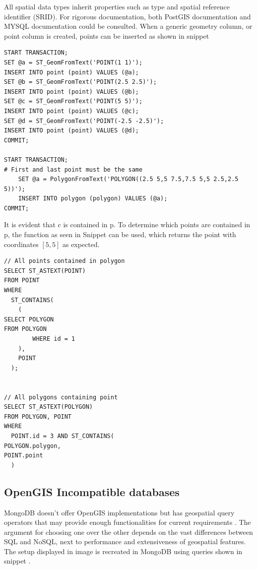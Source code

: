 All spatial data types inherit properties such as type and spatial reference identifier (SRID). For rigorous documentation, both PostGIS documentation  and MYSQL documentation  could be consulted. When a generic geometry column, or point column is created, points can be inserted as shown in snippet 

\begin{Verbatim}[fontsize=\scriptsize]
START TRANSACTION;
SET @a = ST_GeomFromText('POINT(1 1)');
INSERT INTO point (point) VALUES (@a);
SET @b = ST_GeomFromText('POINT(2.5 2.5)');
INSERT INTO point (point) VALUES (@b);
SET @c = ST_GeomFromText('POINT(5 5)');
INSERT INTO point (point) VALUES (@c);
SET @d = ST_GeomFromText('POINT(-2.5 -2.5)');
INSERT INTO point (point) VALUES (@d);
COMMIT;

START TRANSACTION;
# First and last point must be the same
	SET @a = PolygonFromText('POLYGON((2.5 5,5 7.5,7.5 5,5 2.5,2.5 5))');
	INSERT INTO polygon (polygon) VALUES (@a);
COMMIT;
\end{Verbatim}

It is evident that c is contained in p. To determine which points are contained in p, the function as seen in Snippet  can be used, which returns the point with coordinates $[5, 5]$ as expected.

\begin{Verbatim}[fontsize=\scriptsize]
// All points contained in polygon
SELECT ST_ASTEXT(POINT)
FROM POINT
WHERE
  ST_CONTAINS(
    (
SELECT POLYGON
FROM POLYGON
        WHERE id = 1
    ),
    POINT
  );


// All polygons containing point
SELECT ST_ASTEXT(POLYGON)
FROM POLYGON, POINT
WHERE
  POINT.id = 3 AND ST_CONTAINS(
POLYGON.polygon,
POINT.point
  )
\end{Verbatim}

\subsection{OpenGIS Incompatible databases}
MongoDB doesn’t offer OpenGIS implementations but has geospatial query operators that may provide enough functionalities for current requirements . The argument for choosing one over the other depends on the vast differences between SQL and NoSQL, next to performance and extensiveness of geospatial features. The setup displayed in image  is recreated in MongoDB using queries shown in snippet .

